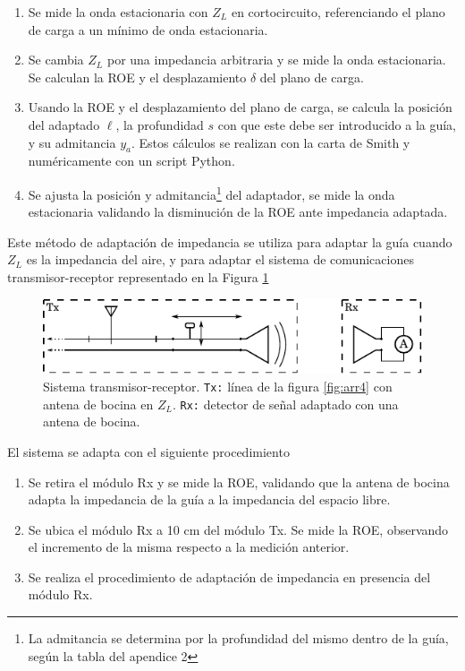 \documentclass[11pt,a4paper]{article}
\begin{document}
\begin{multicols}{2}
\begin{enumerate}
    \item Se mide la onda estacionaria con $Z_L$ en cortocircuito, referenciando el plano de carga a un mínimo de onda estacionaria.
    \item Se cambia $Z_L$ por una impedancia arbitraria y se mide la onda estacionaria. Se calculan la ROE y el desplazamiento $\delta$ del plano de carga.
    \item Usando la ROE y el desplazamiento del plano de carga, se calcula la posición del adaptado $\ell$, la profundidad $s$ con que este debe ser introducido a la guía, y su admitancia $y_a$. 
    Estos cálculos se realizan con la carta de Smith y numéricamente con un script Python.
    \item Se ajusta la posición y admitancia\footnote{La admitancia se determina por la profundidad del mismo dentro de la guía, según la tabla del apendice 2} del adaptador, se mide la onda estacionaria validando la disminución de la ROE ante impedancia adaptada.
\end{enumerate}

Este método de adaptación de impedancia se utiliza para adaptar la guía cuando $Z_L$ es la impedancia del aire, y para adaptar el sistema de comunicaciones transmisor-receptor representado en la Figura \ref{fig:sistema}

\begin{figure}[H]
    \centering
    \includegraphics[width=\linewidth]{Images/sistema.pdf}
    \caption{Sistema transmisor-receptor.
    \texttt{Tx:} línea de la figura \ref{fig:arr4} con antena de bocina en $Z_L$. 
    \texttt{Rx:} detector de señal adaptado con una antena de bocina.}
    \label{fig:sistema}
\end{figure}

El sistema se adapta con el siguiente procedimiento
\begin{enumerate}
    \item Se retira el módulo Rx y se mide la ROE, validando que la antena de bocina adapta la impedancia de la guía a la impedancia del espacio libre.
    \item Se ubica el módulo Rx a 10 cm del módulo Tx. Se mide la ROE, observando el incremento de la misma respecto a la medición anterior.
    \item Se realiza el procedimiento de adaptación de impedancia en presencia del módulo Rx.
\end{enumerate}


\end{multicols}
\end{document}
